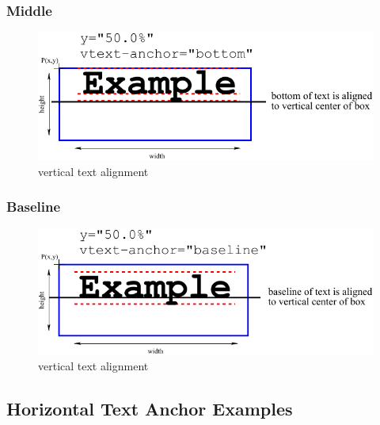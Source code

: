 \clearpage

\subsubsection{Middle}

\begin{figure}[h!]
\begin{center}
\includegraphics[scale=0.60]{figures/VerticalTextPlacement4}
\end{center}
\caption{vertical text alignment }
\label{VerticalTextPlacement4}
\end{figure}

\subsubsection{Baseline}

\begin{figure}[h!]
\begin{center}
\includegraphics[scale=0.60]{figures/VerticalTextPlacement5}
\end{center}
\caption{vertical text alignment }
\label{VerticalTextPlacement5}
\end{figure}

\clearpage

\subsection{Horizontal Text Anchor Examples}

